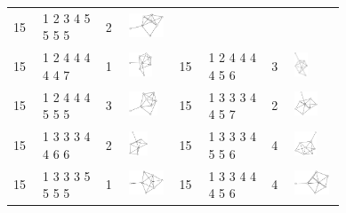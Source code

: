 \begin{footnotesize}
\begin{longtable}{
        m{0.05\linewidth} m{0.15\linewidth} m{0.05\linewidth} m{0.12\linewidth} |
        m{0.05\linewidth} m{0.15\linewidth} m{0.05\linewidth} m{0.12\linewidth}
    }
15 & 1 2 3 4 5 5 5 5 & 2 & \includegraphics[height=0.7151cm]{15-universal-graphs/img/degree-sequences-example-graphs/graph-4-8-97}\\
15 & 1 2 4 4 4 4 4 7 & 1 & \includegraphics[height=0.7151cm]{15-universal-graphs/img/degree-sequences-example-graphs/graph-4-8-98} &
15 & 1 2 4 4 4 4 5 6 & 3 & \includegraphics[height=0.7151cm]{15-universal-graphs/img/degree-sequences-example-graphs/graph-4-8-99}\\
15 & 1 2 4 4 4 5 5 5 & 3 & \includegraphics[height=0.7151cm]{15-universal-graphs/img/degree-sequences-example-graphs/graph-4-8-100} &
15 & 1 3 3 3 4 4 5 7 & 2 & \includegraphics[height=0.7151cm]{15-universal-graphs/img/degree-sequences-example-graphs/graph-4-8-101}\\
15 & 1 3 3 3 4 4 6 6 & 2 & \includegraphics[height=0.7151cm]{15-universal-graphs/img/degree-sequences-example-graphs/graph-4-8-102} &
15 & 1 3 3 3 4 5 5 6 & 4 & \includegraphics[height=0.7151cm]{15-universal-graphs/img/degree-sequences-example-graphs/graph-4-8-103}\\
15 & 1 3 3 3 5 5 5 5 & 1 & \includegraphics[height=0.7151cm]{15-universal-graphs/img/degree-sequences-example-graphs/graph-4-8-104} &
15 & 1 3 3 4 4 4 5 6 & 4 & \includegraphics[height=0.7151cm]{15-universal-graphs/img/degree-sequences-example-graphs/graph-4-8-105}\\

\end{longtable}
\end{footnotesize}
